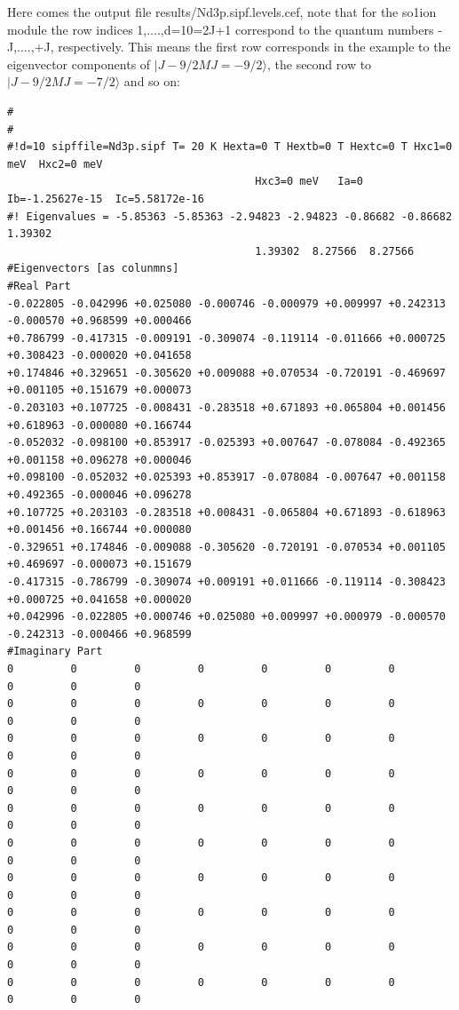 \begin{enumerate}
Here comes the output file {\prg results/Nd3p.sipf.levels.cef}, note that for the so1ion module
the row indices 1,....,d=10=2J+1 correspond to the quantum numbers -J,....,+J, respectively. This
means the first row corresponds in the example to the eigenvector components of $|J-9/2 MJ=-9/2\rangle$,
 the second row to $|J-9/2 MJ=-7/2\rangle$ and so on:
{\footnotesize
\begin{verbatim} 
#
#
#!d=10 sipffile=Nd3p.sipf T= 20 K Hexta=0 T Hextb=0 T Hextc=0 T Hxc1=0 meV  Hxc2=0 meV  
                                       Hxc3=0 meV   Ia=0  Ib=-1.25627e-15  Ic=5.58172e-16 
#! Eigenvalues = -5.85363 -5.85363 -2.94823 -2.94823 -0.86682 -0.86682  1.39302  
                                       1.39302  8.27566  8.27566 
#Eigenvectors [as colunmns]
#Real Part
-0.022805 -0.042996 +0.025080 -0.000746 -0.000979 +0.009997 +0.242313 -0.000570 +0.968599 +0.000466 
+0.786799 -0.417315 -0.009191 -0.309074 -0.119114 -0.011666 +0.000725 +0.308423 -0.000020 +0.041658 
+0.174846 +0.329651 -0.305620 +0.009088 +0.070534 -0.720191 -0.469697 +0.001105 +0.151679 +0.000073 
-0.203103 +0.107725 -0.008431 -0.283518 +0.671893 +0.065804 +0.001456 +0.618963 -0.000080 +0.166744 
-0.052032 -0.098100 +0.853917 -0.025393 +0.007647 -0.078084 -0.492365 +0.001158 +0.096278 +0.000046 
+0.098100 -0.052032 +0.025393 +0.853917 -0.078084 -0.007647 +0.001158 +0.492365 -0.000046 +0.096278 
+0.107725 +0.203103 -0.283518 +0.008431 -0.065804 +0.671893 -0.618963 +0.001456 +0.166744 +0.000080 
-0.329651 +0.174846 -0.009088 -0.305620 -0.720191 -0.070534 +0.001105 +0.469697 -0.000073 +0.151679 
-0.417315 -0.786799 -0.309074 +0.009191 +0.011666 -0.119114 -0.308423 +0.000725 +0.041658 +0.000020 
+0.042996 -0.022805 +0.000746 +0.025080 +0.009997 +0.000979 -0.000570 -0.242313 -0.000466 +0.968599 
#Imaginary Part
0         0         0         0         0         0         0         0         0         0         
0         0         0         0         0         0         0         0         0         0         
0         0         0         0         0         0         0         0         0         0         
0         0         0         0         0         0         0         0         0         0         
0         0         0         0         0         0         0         0         0         0         
0         0         0         0         0         0         0         0         0         0         
0         0         0         0         0         0         0         0         0         0         
0         0         0         0         0         0         0         0         0         0         
0         0         0         0         0         0         0         0         0         0         
0         0         0         0         0         0         0         0         0         0 
\end{verbatim}
}


\end{enumerate}
